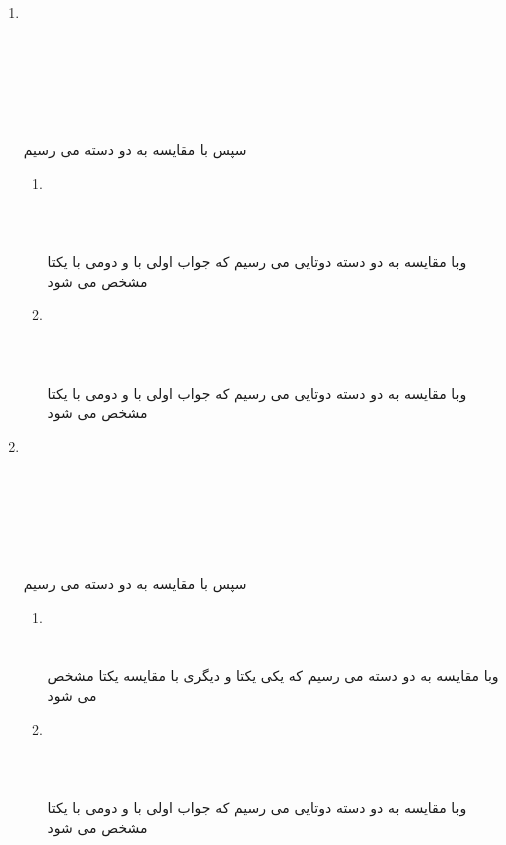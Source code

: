 \documentclass[a4paper]{article}
\begin{document}
\begin{enumerate}
\item{}
\\
\\
\\
\\
\\
\\
\\
سپس با مقایسه
به دو دسته می رسیم
\begin{enumerate}
\item{}
\\
\\
\\
\\
وبا مقایسه
به دو دسته دوتایی می رسیم که جواب اولی با
و دومی با 
یکتا مشخص می شود

\item{}
\\
\\
\\
\\
وبا مقایسه
به دو دسته دوتایی می رسیم که جواب اولی با
و دومی با 
یکتا مشخص می شود

\end{enumerate}


\item{}
\\
\\
\\
\\
\\
\\
\\
سپس با مقایسه
به دو دسته می رسیم
\begin{enumerate}
\item{}
\\
\\
\\

وبا مقایسه
به دو دسته می رسیم که یکی یکتا و دیگری با مقایسه
یکتا مشخص می شود

\item{}
\\
\\
\\
\\
وبا مقایسه
به دو دسته دوتایی می رسیم که جواب اولی با
و دومی با 
یکتا مشخص می شود

\end{enumerate}

\end{enumerate}
\newpage
\end{document}
